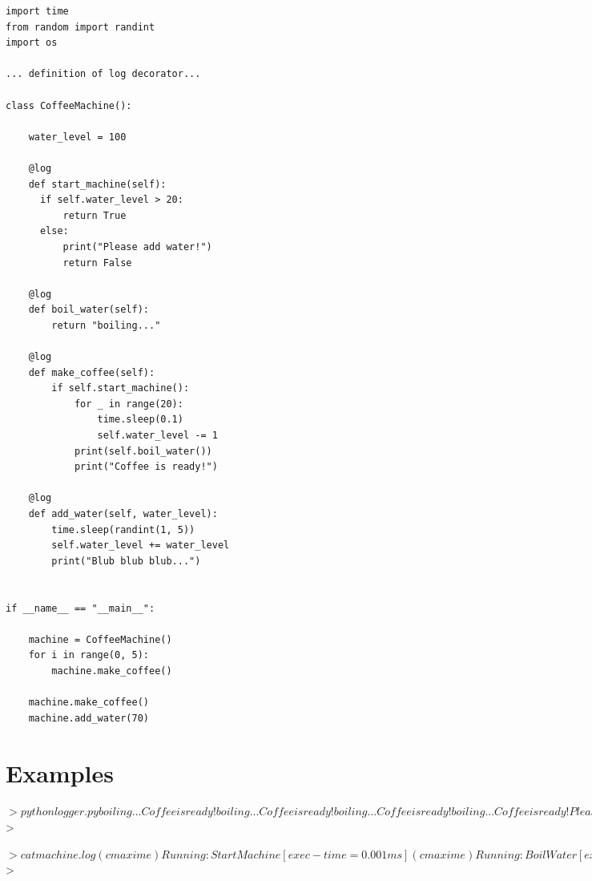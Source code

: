 \documentclass{42-en}
\begin{document}
\begin{verbatim}
import time
from random import randint
import os

... definition of log decorator...

class CoffeeMachine():

	water_level = 100

	@log
	def start_machine(self):
	  if self.water_level > 20:
		  return True
	  else:
		  print("Please add water!")
		  return False
	
	@log
	def boil_water(self):
		return "boiling..."
	
	@log
	def make_coffee(self):
		if self.start_machine():
			for _ in range(20):
				time.sleep(0.1)
				self.water_level -= 1
			print(self.boil_water())
			print("Coffee is ready!")
	
	@log
	def add_water(self, water_level):
		time.sleep(randint(1, 5))
		self.water_level += water_level
		print("Blub blub blub...")


if __name__ == "__main__":
	
	machine = CoffeeMachine()
	for i in range(0, 5):
		machine.make_coffee()

	machine.make_coffee()
	machine.add_water(70)
\end{verbatim}

\section*{Examples}
\begin{42console}
  $> python logger.py
  boiling...
  Coffee is ready!
  boiling...
  Coffee is ready!
  boiling...
  Coffee is ready!
  boiling...
  Coffee is ready!
  Please add water!
  Please add water!
  Blub blub blub...
  $>
\end{42console}

\begin{42console}
  $> cat machine.log
  (cmaxime)Running: Start Machine      [ exec-time = 0.001 ms ]
  (cmaxime)Running: Boil Water         [ exec-time = 0.005 ms ]
  (cmaxime)Running: Make Coffee        [ exec-time = 2.499 s  ]
  (cmaxime)Running: Start Machine      [ exec-time = 0.002 ms ]
  (cmaxime)Running: Boil Water         [ exec-time = 0.005 ms ]
  (cmaxime)Running: Make Coffee        [ exec-time = 2.618 s  ]
  (cmaxime)Running: Start Machine      [ exec-time = 0.003 ms ]
  (cmaxime)Running: Boil Water         [ exec-time = 0.004 ms ]
  (cmaxime)Running: Make Coffee        [ exec-time = 2.676 s  ]
  (cmaxime)Running: Start Machine      [ exec-time = 0.003 ms ]
  (cmaxime)Running: Boil Water         [ exec-time = 0.004 ms ]
  (cmaxime)Running: Make Coffee        [ exec-time = 2.648 s  ]
  (cmaxime)Running: Start Machine      [ exec-time = 0.011 ms ]
  (cmaxime)Running: Make Coffee        [ exec-time = 0.029 ms ]
  (cmaxime)Running: Start Machine      [ exec-time = 0.009 ms ]
  (cmaxime)Running: Make Coffee        [ exec-time = 0.024 ms ]
  (cmaxime)Running: Add Water          [ exec-time = 5.026 s  ]
  $>
\end{42console}
\end{document}
